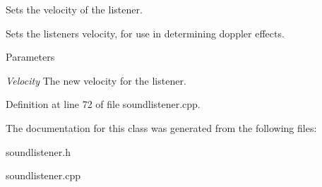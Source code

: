 Sets the velocity of the listener. 

Sets the listeners velocity, for use in determining doppler effects. 
\begin{DoxyParams}{Parameters}
\item[{\em Velocity}]The new velocity for the listener. \end{DoxyParams}


Definition at line 72 of file soundlistener.cpp.



The documentation for this class was generated from the following files:\begin{DoxyCompactItemize}
\item 
soundlistener.h\item 
soundlistener.cpp\end{DoxyCompactItemize}
